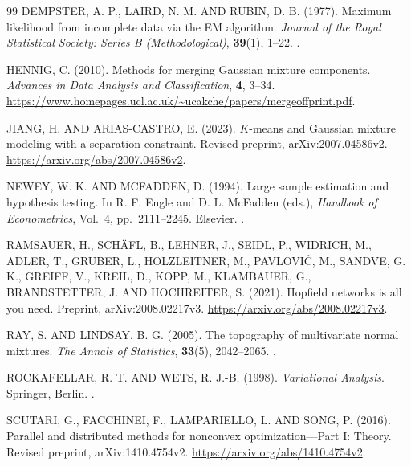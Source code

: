 \begin{thebibliography}{99}
\MakeUppercase{Dempster, A. P., Laird, N. M. and Rubin, D. B.} (1977).
Maximum likelihood from incomplete data via the EM algorithm.
\emph{Journal of the Royal Statistical Society: Series B (Methodological)},
\textbf{39}(1), 1--22.
.

\MakeUppercase{Hennig, C.} (2010).
Methods for merging Gaussian mixture components.
\emph{Advances in Data Analysis and Classification}, \textbf{4}, 3--34.
\url{https://www.homepages.ucl.ac.uk/~ucakche/papers/mergeoffprint.pdf}.

\MakeUppercase{Jiang, H. and Arias-Castro, E.} (2023).
$K$-means and Gaussian mixture modeling with a separation constraint.
Revised preprint, arXiv:2007.04586v2.
\url{https://arxiv.org/abs/2007.04586v2}.

\MakeUppercase{Newey, W. K. and McFadden, D.} (1994).
Large sample estimation and hypothesis testing.
In R. F. Engle and D. L. McFadden (eds.),
\emph{Handbook of Econometrics}, Vol.~4, pp.~2111--2245. Elsevier.
.

\MakeUppercase{Ramsauer, H., Schäfl, B., Lehner, J., Seidl, P., Widrich, M., Adler, T.,
Gruber, L., Holzleitner, M., Pavlović, M., Sandve, G. K., Greiff, V.,
Kreil, D., Kopp, M., Klambauer, G., Brandstetter, J. and Hochreiter, S.} (2021).
Hopfield networks is all you need.
Preprint, arXiv:2008.02217v3.
\url{https://arxiv.org/abs/2008.02217v3}.

\MakeUppercase{Ray, S. and Lindsay, B. G.} (2005).
The topography of multivariate normal mixtures.
\emph{The Annals of Statistics}, \textbf{33}(5), 2042--2065.
.

\MakeUppercase{Rockafellar, R. T. and Wets, R. J.-B.} (1998).
\emph{Variational Analysis}. Springer, Berlin.
.

\MakeUppercase{Scutari, G., Facchinei, F., Lampariello, L. and Song, P.} (2016).
Parallel and distributed methods for nonconvex optimization---Part I: Theory.
Revised preprint, arXiv:1410.4754v2.
\url{https://arxiv.org/abs/1410.4754v2}.


\end{thebibliography}
